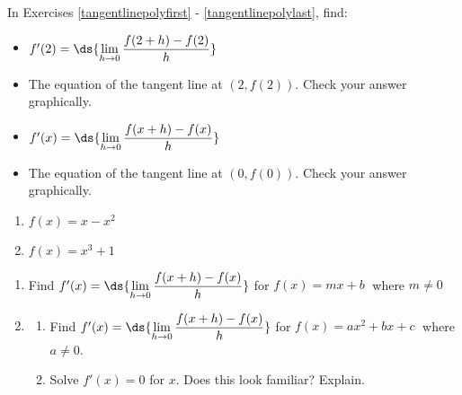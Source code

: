 \documentclass{ximera}
\begin{document}
In Exercises \ref{tangentlinepolyfirst} - \ref{tangentlinepolylast}, find:


\begin{itemize}

\item  $f'(2)  = \ds{\lim_{h \rightarrow 0} \dfrac{f(2+h) - f(2)}{h}}$

\item  The equation of the tangent line at $(2, f(2))$.  Check your answer graphically.

\item  $f'(x) = \ds{\lim_{h \rightarrow 0} \dfrac{f(x+h) - f(x)}{h}}$

\item  The equation of the tangent line at $(0,f(0))$.  Check your answer graphically.
 
\end{itemize}



\begin{multicols}{2}
\begin{enumerate}
\setcounter{enumi}{\value{HW}}

\item\label{tangentlinepolyfirst}  $f(x) = x-x^2$ 
\item\label{tangentlinepolylast} $f(x) = x^{3} + 1$

\setcounter{HW}{\value{enumi}}
\end{enumerate}
\end{multicols}




\begin{enumerate}
\setcounter{enumi}{\value{HW}}

\item  Find $f'(x) = \ds{\lim_{h \rightarrow 0} \dfrac{f(x+h) - f(x)}{h}}$  for $f(x) = mx + b\;$ where $m \neq 0$

\item\label{quadraticderivativeformulaexercise} \begin{enumerate}  \item Find $f'(x) = \ds{\lim_{h \rightarrow 0} \dfrac{f(x+h) - f(x)}{h}}$   for  $f(x) = ax^{2} + bx + c\;$ where $a \neq 0$.

\item  Solve $f'(x) = 0$ for $x$.  Does this look familiar?  Explain.

\end{enumerate}

\setcounter{HW}{\value{enumi}}
\end{enumerate}
\end{document}
